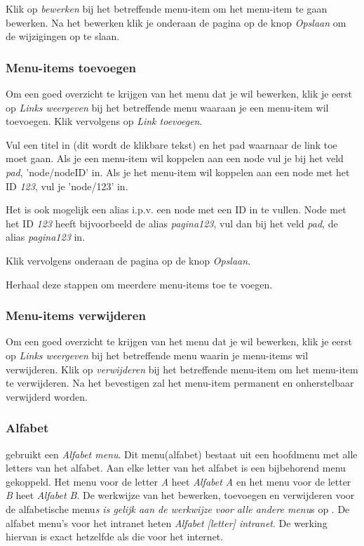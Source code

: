 Klik op \emph{bewerken} bij het betreffende menu-item om het menu-item te gaan bewerken. Na het bewerken klik je onderaan de pagina op de knop \emph{Opslaan} om de wijzigingen op te slaan.


\subsubsection{Menu-items toevoegen}\label{menuitemstoevoegen}

Om een goed overzicht te krijgen van het menu dat je wil bewerken, klik je eerst op \emph{Links weergeven} bij het betreffende menu waaraan je een menu-item wil toevoegen. Klik vervolgens op \emph{Link toevoegen}. 

Vul een titel in (dit wordt de klikbare tekst) en het pad waarnaar de link toe moet gaan. Als je een menu-item wil koppelen aan een node vul je bij het veld \emph{pad}, 'node/nodeID' in. Als je het menu-item wil koppelen aan een node met het ID \emph{123}, vul je 'node/123' in. 

Het is ook mogelijk een alias i.p.v. een node met een ID in te vullen. Node met het ID \emph{123} heeft bijvoorbeeld de alias \emph{pagina123}, vul dan bij het veld \emph{pad}, de alias \emph{pagina123} in. 

Klik vervolgens onderaan de pagina op de knop \emph{Opslaan}.

Herhaal deze stappen om meerdere menu-items toe te voegen.  

\subsubsection{Menu-items verwijderen}\label{menuitemsverwijderen}

Om een goed overzicht te krijgen van het menu dat je wil bewerken, klik je eerst op \emph{Links weergeven} bij het betreffende menu waarin je menu-items wil verwijderen. Klik op \emph{verwijderen} bij het betreffende menu-item om het menu-item te verwijderen. Na het bevestigen zal het menu-item permanent en onherstelbaar verwijderd worden.


\subsubsection{Alfabet}\label{alfabet}

\drupalpath gebruikt een \emph{Alfabet menu}. Dit menu(alfabet) bestaat uit een hoofdmenu met alle letters van het alfabet. Aan elke letter van het alfabet is een bijbehorend menu gekoppeld. Het menu voor de letter \emph{A} heet \emph{Alfabet A} en het menu voor de letter \emph{B} heet \emph{Alfabet B}. De werkwijze van het bewerken, toevoegen en verwijderen voor de alfabetische menu\emph{s is gelijk aan de werkwijze voor alle andere menu}s op \drupalpath{}. De alfabet menu's voor het intranet heten \emph{Alfabet [letter] intranet}. De werking hiervan is exact hetzelfde als die voor het internet.

